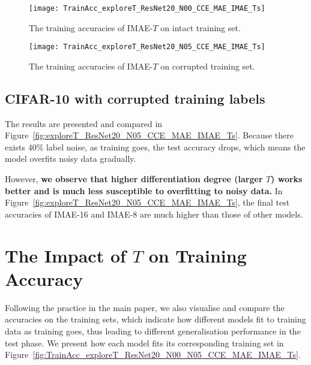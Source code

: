 \documentclass{article}
\begin{document}
\begin{figure*}[t!]
	\centering
\begin{subfigure}[t!]{0.48\linewidth}
		\centering
		\captionsetup{width=1\linewidth}
		\texttt{[image: TrainAcc\_exploreT\_ResNet20\_N00\_CCE\_MAE\_IMAE\_Ts]}
		\caption{The training accuracies of  IMAE-$T$ on intact training set.}
		\label{fig:TrainAcc_exploreT_ResNet20_N00_CCE_MAE_IMAE_Ts}
	\end{subfigure}
	\begin{subfigure}[t!]{0.48\linewidth}
		\centering
		\captionsetup{width=1\linewidth}
		\texttt{[image: TrainAcc\_exploreT\_ResNet20\_N05\_CCE\_MAE\_IMAE\_Ts]}
		\caption{The training accuracies of  IMAE-$T$ on corrupted training set.}
		\label{fig:TrainAcc_exploreT_ResNet20_N05_CCE_MAE_IMAE_Ts}
	\end{subfigure}
\caption{The accuracy on CIFAR-10 \textit{training sets} along with training iterations.
		We show the results when training on intact training set and corrupted training set.  
		\textit{Better viewed in colour.} }
	\label{fig:TrainAcc_exploreT_ResNet20_N00_N05_CCE_MAE_IMAE_Ts}
\end{figure*}


\subsection{CIFAR-10 with corrupted training labels}

The results are presented and compared in Figure~\ref{fig:exploreT_ResNet20_N05_CCE_MAE_IMAE_Ts}.
Because there exists 40\% label noise, as training goes, the test accuracy drops, which means the model overfits noisy data gradually. 

However, \textbf{we observe that higher differentiation degree (larger $T$) works better and is much less susceptible to overfitting to noisy data.} 
In Figure~\ref{fig:exploreT_ResNet20_N05_CCE_MAE_IMAE_Ts}, the final test accuracies of IMAE-16 and IMAE-8 are much higher than those of other models. 

\section{The Impact of $T$ on Training Accuracy}

Following the practice in the main paper, we also visualise and compare the accuracies on the training sets, which indicate how different models fit to training data as training goes, thus leading to different generalisation performance in the test phase. 
We present how each model fits its corresponding training set in Figure~\ref{fig:TrainAcc_exploreT_ResNet20_N00_N05_CCE_MAE_IMAE_Ts}.
\end{document}
